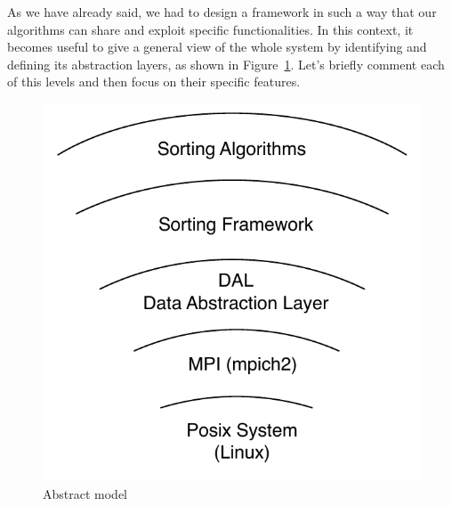 As we have already said, we had to design a framework in such a way that our algorithms can share and exploit specific functionalities. In this context, it becomes useful to give a general view of the whole system by identifying and defining its abstraction layers, as shown in Figure~\ref{levels}. Let's briefly comment each of this levels and then focus on their specific features.
\begin{figure}[h]
  \begin{center}
    \includegraphics[scale=0.60]{levels}
  \end{center} 
  \caption{Abstract model}
  \label{levels}
\end{figure}
